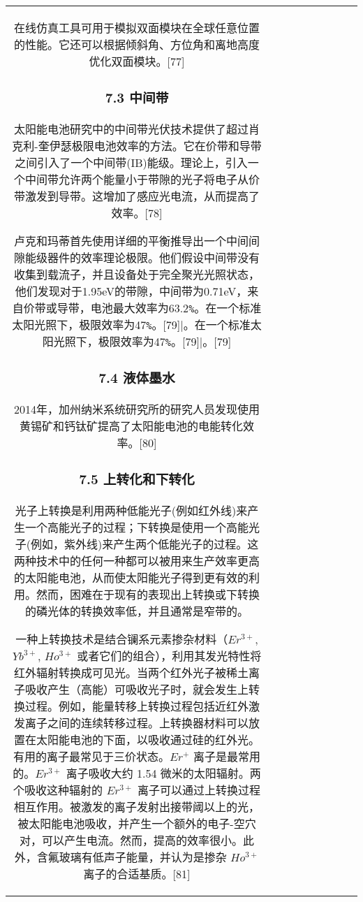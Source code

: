 \begin{table}[ht]
\begin{tabular}{|c|c|c|c|c|c|c|c|c}
在线仿真工具可用于模拟双面模块在全球任意位置的性能。它还可以根据倾斜角、方位角和离地高度优化双面模块。[77]

\subsubsection{7.3 中间带}

太阳能电池研究中的中间带光伏技术提供了超过肖克利-奎伊瑟极限电池效率的方法。它在价带和导带之间引入了一个中间带(IB)能级。理论上，引入一个中间带允许两个能量小于带隙的光子将电子从价带激发到导带。这增加了感应光电流，从而提高了效率。[78]

卢克和玛蒂首先使用详细的平衡推导出一个中间间隙能级器件的效率理论极限。他们假设中间带没有收集到载流子，并且设备处于完全聚光光照状态，他们发现对于1.95eV的带隙，中间带为0.71eV，来自价带或导带，电池最大效率为63.2\verb|%|。在一个标准太阳光照下，极限效率为47\verb|%|。[79]

\subsubsection{7.4 液体墨水}

2014年，加州纳米系统研究所的研究人员发现使用黄锡矿和钙钛矿提高了太阳能电池的电能转化效率。[80]

\subsubsection{7.5 上转化和下转化}

光子上转换是利用两种低能光子(例如红外线)来产生一个高能光子的过程；下转换是使用一个高能光子(例如，紫外线)来产生两个低能光子的过程。这两种技术中的任何一种都可以被用来生产效率更高的太阳能电池，从而使太阳能光子得到更有效的利用。然而，困难在于现有的表现出上转换或下转换的磷光体的转换效率低，并且通常是窄带的。

一种上转换技术是结合镧系元素掺杂材料（$Er^{3+}$, $Yb^{3+}$, $Ho^{3+}$ 或者它们的组合），利用其发光特性将红外辐射转换成可见光。当两个红外光子被稀土离子吸收产生（高能）可吸收光子时，就会发生上转换过程。例如，能量转移上转换过程包括近红外激发离子之间的连续转移过程。上转换器材料可以放置在太阳能电池的下面，以吸收通过硅的红外光。有用的离子最常见于三价状态。$Er^{+}$ 离子是最常用的。$Er^{3+}$ 离子吸收大约 1.54 微米的太阳辐射。两个吸收这种辐射的 $Er^{3+}$ 离子可以通过上转换过程相互作用。被激发的离子发射出接带阈以上的光，被太阳能电池吸收，并产生一个额外的电子-空穴对，可以产生电流。然而，提高的效率很小。此外，含氟玻璃有低声子能量，并认为是掺杂 $Ho^{3+}$ 离子的合适基质。[81]


\end{tabular}
\end{table}
